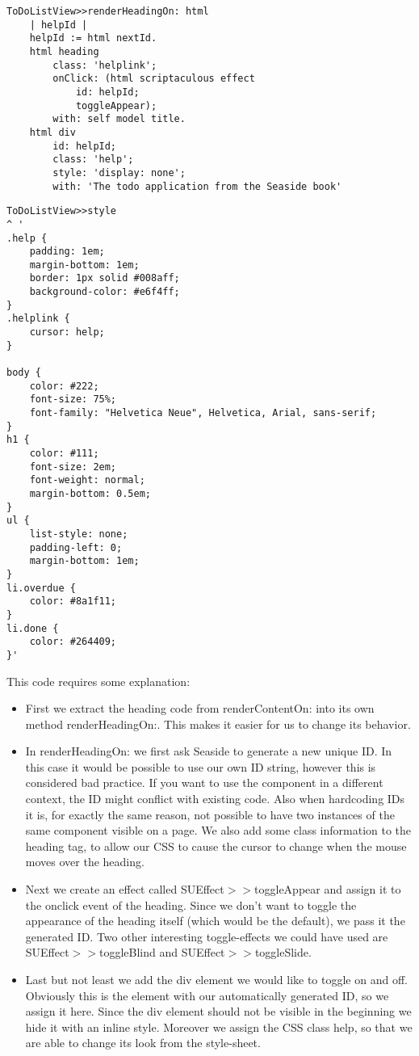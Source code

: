 \documentclass[a4paper,10pt,twoside]{book}
\newcommand{\ct}[1]{{\small\ttfamily\textup{#1}}}
\begin{document}
\begin{lstlisting}
ToDoListView>>renderHeadingOn: html
    | helpId |
    helpId := html nextId.
    html heading
        class: 'helplink';
        onClick: (html scriptaculous effect
            id: helpId;
            toggleAppear);
        with: self model title.
    html div
        id: helpId;
        class: 'help';
        style: 'display: none';
        with: 'The todo application from the Seaside book'
\end{lstlisting}

\begin{lstlisting}
ToDoListView>>style
^ '
.help {
    padding: 1em;
    margin-bottom: 1em;
    border: 1px solid #008aff;
    background-color: #e6f4ff;
}
.helplink {
    cursor: help;
}

body {
    color: #222;
    font-size: 75%;
    font-family: "Helvetica Neue", Helvetica, Arial, sans-serif;
}
h1 {
    color: #111;
    font-size: 2em;
    font-weight: normal;
    margin-bottom: 0.5em;
}
ul {
    list-style: none;
    padding-left: 0;
    margin-bottom: 1em;
}
li.overdue {
    color: #8a1f11;
}
li.done {
    color: #264409;
}'
\end{lstlisting}

This code requires some explanation:

\begin{itemize}
\item  First we extract the heading code from \ct{renderContentOn:} into its own method \ct{renderHeadingOn:}. This makes it easier for us to change its behavior.
\item  In \ct{renderHeadingOn:} we first ask Seaside to generate a new unique ID. In this case it would be possible to use our own ID string, however this is considered bad practice. If you want to use the component in a different context, the ID might conflict with existing code. Also when hardcoding IDs it is, for exactly the same reason, not possible to have two instances of the same component visible on a page. We also add some class information to the heading tag, to allow our CSS to cause the cursor to change when the mouse moves over the heading.
\item  Next we create an effect called  \ct{SUEffect$>$$>$toggleAppear} and assign it to the \ct{onclick} event of the heading. Since we don't want to toggle the appearance of the heading itself (which would be the default), we pass it the generated ID. Two other interesting toggle-effects we could have used are  \ct{SUEffect$>$$>$toggleBlind} and  \ct{SUEffect$>$$>$toggleSlide}.
\item  Last but not least we add the div element we would like to toggle on and off. Obviously this is the element with our automatically generated ID, so we assign it here. Since the div element should not be visible in the beginning we hide it with an inline style. Moreover we assign the CSS class \ct{help}, so that we are able to change its look from the style-sheet.
\end{itemize}
\end{document}
